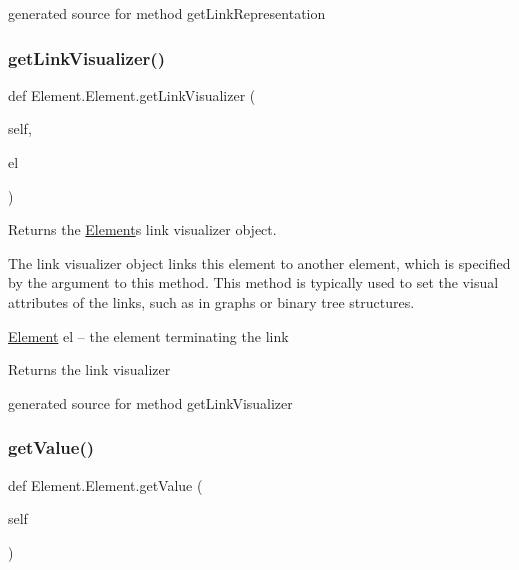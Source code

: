 \begin{DoxyVerb}generated source for method getLinkRepresentation \end{DoxyVerb}
 \hypertarget{class_element_1_1_element_aad4a71d78f6c60de5bf871fd7632d720}{}\label{class_element_1_1_element_aad4a71d78f6c60de5bf871fd7632d720} 
\subsubsection{\texorpdfstring{get\+Link\+Visualizer()}{getLinkVisualizer()}}
{\footnotesize\ttfamily def Element.\+Element.\+get\+Link\+Visualizer (\begin{DoxyParamCaption}\item[{}]{self,  }\item[{}]{el }\end{DoxyParamCaption})}



Returns the \hyperlink{class_element_1_1_element}{Element}\textquotesingle{}s link visualizer object. 

The link visualizer object links this element to another element, which is specified by the argument to this method. This method is typically used to set the visual attributes of the links, such as in graphs or binary tree structures.

\hyperlink{class_element_1_1_element}{Element} el -- the element terminating the link

\begin{DoxyReturn}{Returns}
the link visualizer\begin{DoxyVerb}generated source for method getLinkVisualizer \end{DoxyVerb}
 
\end{DoxyReturn}
\hypertarget{class_element_1_1_element_a55c19f29f1c643e13e11441c4f3491e0}{}\label{class_element_1_1_element_a55c19f29f1c643e13e11441c4f3491e0} 
\subsubsection{\texorpdfstring{get\+Value()}{getValue()}}
{\footnotesize\ttfamily def Element.\+Element.\+get\+Value (\begin{DoxyParamCaption}\item[{}]{self }\end{DoxyParamCaption})}

